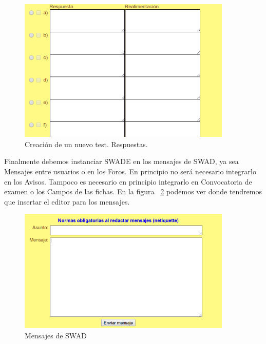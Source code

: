 \begin{figure}[h!]
  \centering
      \includegraphics[width=4in]{fig/inte_test2}
  \caption{Creación de un nuevo test. Respuestas.}
  \label{fig:inte_test2}

\end{figure}


Finalmente debemos instanciar SWADE en los mensajes de SWAD, ya sea Mensajes entre usuarios o en los Foros. En principio no será necesario integrarlo en los Avisos. Tampoco es necesario en principio integrarlo en Convocatoria de examen o los Campos de las fichas. En la figura ~\ref{fig:inte_men} podemos ver donde tendremos que insertar el editor para los mensajes.

\begin{figure}[h!]
  \centering
      \includegraphics[width=4in]{fig/inte_men}
  \caption{Mensajes de SWAD}
  \label{fig:inte_men}

\end{figure}
